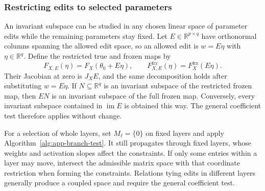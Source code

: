 \documentclass[twoside]{article}
\theoremstyle{remark}
\DeclareMathOperator{\im}{im}
\newcommand{\R}{\mathbb R}
\newcommand{\frz}{\mathrm{frz}}
\theoremstyle{highlightdefinition}
\theoremstyle{remark}
\begin{document}
\subsubsection{Restricting edits to selected parameters}\label{app:restricted-parameters}
An invariant subspace can be studied in any chosen linear space of parameter edits while the remaining parameters stay fixed. Let $E\in\R^{p\times q}$ have orthonormal columns spanning the allowed edit space, so an allowed edit is $w=E\eta$ with $\eta\in\R^q$. Define the restricted true and frozen maps by
\[
 F_{X,E}(\eta)=F_X(\theta_0+E\eta),\qquad
 F_{X,E}^{\frz}(\eta)=F_X^{\frz}(E\eta).
\]
Their Jacobian at zero is $J_XE$, and the same decomposition holds after substituting $w=E\eta$. If $N\subseteq\R^q$ is an invariant subspace of the restricted frozen map, then $EN$ is an invariant subspace of the full frozen map. Conversely, every invariant subspace contained in $\im E$ is obtained this way. The general coefficient test therefore applies without change.

For a selection of whole layers, set $M_\ell=\{0\}$ on fixed layers and apply Algorithm~\ref{alg:app-branch-test}. It still propagates through fixed layers, whose weights and activation slopes affect the constraints. If only some entries within a layer may move, intersect the admissible matrix space with that coordinate restriction when forming the constraints. Relations tying edits in different layers generally produce a coupled space and require the general coefficient test.



\FloatBarrier
\end{document}
